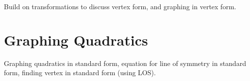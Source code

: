 Build on transformations to discuss vertex form, and graphing in vertex form.

\section{Graphing Quadratics}

Graphing quadratics in standard form, equation for line of symmetry in standard form, finding vertex in standard form (using LOS).

%
%
%
%
%
%
%
%
%
%
%

